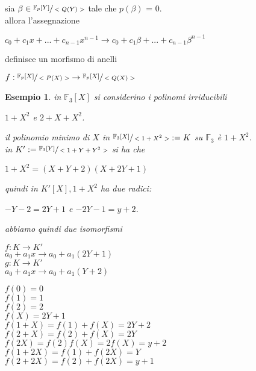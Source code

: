 \documentclass[a4paper,12pt]{article}
\theoremstyle{def}
\theoremstyle{prop}
\theoremstyle{esempio}
\newtheorem*{example}{Esempio}
\theoremstyle{dimostrazione}
\theoremstyle{teo}
\theoremstyle{osservazione}
\begin{document}
\vspace{\baselineskip}

sia \(\beta \in \sfrac{\mathbb{F}_p[Y]}{<Q(Y)>}\) tale che \(p(\beta)\) = 0.\\
allora l'assegnazione
\begin{center}
	\(c_0 + c_1 x + ... + c_{n-1} x^{n-1} \rightarrow c_0 + c_1 \beta + ... + c_{n-1} \beta^{n-1}\)
\end{center}
definisce un morfismo di anelli
\begin{center}
	\(f: \sfrac{\mathbb{F}_p[X]}{<P(X)>} \rightarrow \sfrac{\mathbb{F}_p[X]}{<Q(X)>}\)
\end{center}

\newpage

\begin{example}
	in \(\mathbb{F}_3[X]\) si considerino i polinomi irriducibili
	\begin{center}
		\(1 + X^2\) e \(2 + X + X^2\).
	\end{center}
	il polinomio minimo di \(X\) in \(\sfrac{\mathbb{F}_3[X]}{<1 + X^2 >} := K\) su \(\mathbb{F}_3\) è \(1 + X^2\).\\
	in \(K' := \sfrac{\mathbb{F}_3[Y]}{<1 + Y + Y^2>}\) si ha che
	\begin{center}
		\(1 + X^2 = (X + Y + 2)(X + 2Y + 1)\)
	\end{center}
	quindi in \(K'[X], 1 + X^2\) ha due radici:
	\begin{center}
		\(-Y-2 = 2Y+1\) e \(-2Y - 1 = y + 2\).
	\end{center}
	abbiamo quindi due isomorfismi
	\begin{center}
		\(f: K \rightarrow K'\)\\
		\(a_0 + a_1x \rightarrow a_0 + a_1(2Y + 1)\)\\
		\(g: K \rightarrow K'\)\\
		\(a_0 + a_1x \rightarrow a_0 + a_1(Y + 2)\)\\
	\end{center}
	\(f(0) = 0\)\\
	\(f(1) = 1\)\\
	\(f(2) = 2\)\\
	\(f(X) = 2Y + 1\)\\
	\(f(1 + X) = f(1) + f(X) = 2Y + 2\)\\
	\(f(2 + X) = f(2) + f(X) = 2Y\)\\
	\(f(2X) = f(2)f(X) = 2f(X) = y + 2\)\\
	\(f(1 + 2X) = f(1) + f(2X) = Y\)\\
	\(f(2 + 2X) = f(2) + f(2X) = y + 1\) \vspace{\baselineskip}\\

\end{example}
\end{document}
